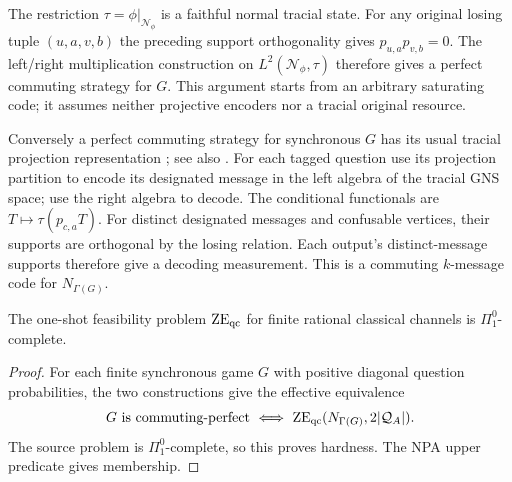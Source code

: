 The restriction $\tau=\phi|_{\mathcal N_\phi}$ is a faithful normal tracial state. For any original losing tuple $(u,a,v,b)$ the preceding support orthogonality gives $p_{u,a}p_{v,b}=0$. The left/right multiplication construction on $L^2(\mathcal N_\phi,\tau)$ therefore gives a perfect commuting strategy for $G$. This argument starts from an arbitrary saturating code; it assumes neither projective encoders nor a tracial original resource.

Conversely a perfect commuting strategy for synchronous $G$ has its usual tracial projection representation \cite[Theorem~5.5]{PSS}; see also \cite{KPS,MNY}. For each tagged question use its projection partition to encode its designated message in the left algebra of the tracial GNS space; use the right algebra to decode. The conditional functionals are $T\mapsto\tau(p_{c,a}T)$. For distinct designated messages and confusable vertices, their supports are orthogonal by the losing relation. Each output's distinct-message supports therefore give a decoding measurement. This is a commuting $k$-message code for $N_{\Gamma(G)}$.

\begin{theorem}\label{thm:qc}
The one-shot feasibility problem $\mathrm{ZE}_{\mathrm{qc}}$ for finite rational classical channels is $\Pi^0_1$-complete.
\end{theorem}
\begin{proof}
For each finite synchronous game $G$ with positive diagonal question probabilities, the two constructions give the effective equivalence
\[
 G\text{ is commuting-perfect}
 \ \Longleftrightarrow\ \mathrm{ZE}_{\mathrm{qc}}(N_{\Gamma(G)},2|\mathcal Q_A|).
\]
The source problem is $\Pi^0_1$-complete, so this proves hardness. The NPA upper predicate gives membership.
\end{proof}
